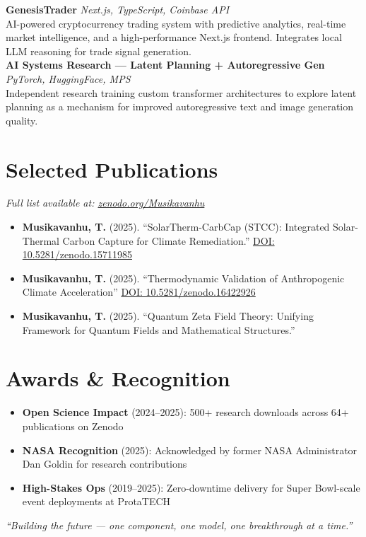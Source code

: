 \documentclass[11pt, letterpaper]{article}
\begin{document}
\textbf{GenesisTrader} \hfill \textit{Next.js, TypeScript, Coinbase API} \\
AI-powered cryptocurrency trading system with predictive analytics, real-time market intelligence, and a high-performance Next.js frontend. Integrates local LLM reasoning for trade signal generation. \\[4pt]

\textbf{AI Systems Research --- Latent Planning + Autoregressive Gen} \hfill \textit{PyTorch, HuggingFace, MPS} \\
Independent research training custom transformer architectures to explore latent planning as a mechanism for improved autoregressive text and image generation quality. \\[4pt]


\section{Selected Publications}
\textit{Full list available at: \href{https://zenodo.org/search?q=Musikavanhu}{zenodo.org/Musikavanhu}}

\begin{itemize}[leftmargin=20pt, itemsep=4pt]
  \item \textbf{Musikavanhu, T.} (2025). ``SolarTherm-CarbCap (STCC): Integrated Solar-Thermal Carbon Capture for Climate Remediation.'' \href{https://zenodo.org/records/15711985}{DOI: 10.5281/zenodo.15711985}
  \item \textbf{Musikavanhu, T.} (2025). ``Thermodynamic Validation of Anthropogenic Climate Acceleration'' \href{https://zenodo.org/records/16422926}{DOI: 10.5281/zenodo.16422926}
  \item \textbf{Musikavanhu, T.} (2025). ``Quantum Zeta Field Theory: Unifying Framework for Quantum Fields and Mathematical Structures.''
\end{itemize}

\section{Awards \& Recognition}

\begin{itemize}[leftmargin=20pt, itemsep=3pt]
  \item \textbf{Open Science Impact} (2024--2025): 500+ research downloads across 64+ publications on Zenodo
  \item \textbf{NASA Recognition} (2025): Acknowledged by former NASA Administrator Dan Goldin for research contributions
  \item \textbf{High-Stakes Ops} (2019--2025): Zero-downtime delivery for Super Bowl-scale event deployments at ProtaTECH
\end{itemize}

\vspace{16pt}
\centerline{\textit{``Building the future --- one component, one model, one breakthrough at a time.''}}
\end{document}
